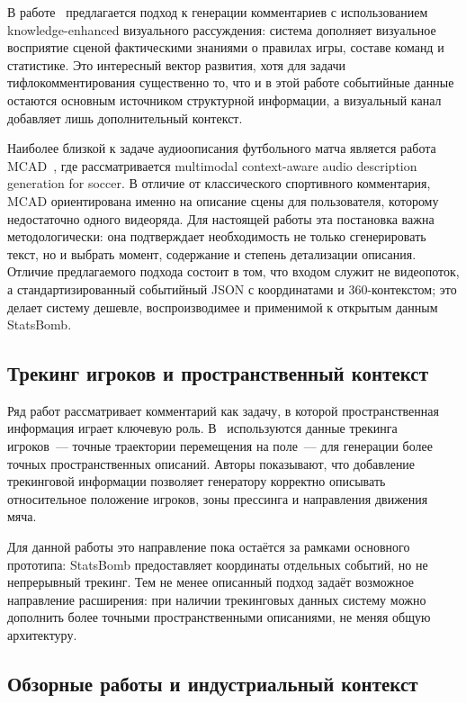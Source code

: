 \documentclass[a4paper,14pt]{extarticle}
\numberwithin{table}{section}
\numberwithin{figure}{section}
\numberwithin{equation}{section}
\begin{document}
В работе~\cite{vision2026} предлагается подход к генерации комментариев с использованием knowledge-enhanced визуального рассуждения: система дополняет визуальное восприятие сценой фактическими знаниями о правилах игры, составе команд и статистике. Это интересный вектор развития, хотя для задачи тифлокомментирования существенно то, что и в этой работе событийные данные остаются основным источником структурной информации, а визуальный канал добавляет лишь дополнительный контекст.

Наиболее близкой к задаче аудиоописания футбольного матча является работа MCAD~\cite{mcad2025}, где рассматривается multimodal context-aware audio description generation for soccer. В отличие от классического спортивного комментария, MCAD ориентирована именно на описание сцены для пользователя, которому недостаточно одного видеоряда. Для настоящей работы эта постановка важна методологически: она подтверждает необходимость не только сгенерировать текст, но и выбрать момент, содержание и степень детализации описания. Отличие предлагаемого подхода состоит в том, что входом служит не видеопоток, а стандартизированный событийный JSON с координатами и 360-контекстом; это делает систему дешевле, воспроизводимее и применимой к открытым данным StatsBomb.

\subsection{Трекинг игроков и пространственный контекст}

Ряд работ рассматривает комментарий как задачу, в которой пространственная информация играет ключевую роль. В~\cite{tracking2025} используются данные трекинга игроков~--- точные траектории перемещения на поле~--- для генерации более точных пространственных описаний. Авторы показывают, что добавление трекинговой информации позволяет генератору корректно описывать относительное положение игроков, зоны прессинга и направления движения мяча.

Для данной работы это направление пока остаётся за рамками основного прототипа: StatsBomb предоставляет координаты отдельных событий, но не непрерывный трекинг. Тем не менее описанный подход задаёт возможное направление расширения: при наличии трекинговых данных систему можно дополнить более точными пространственными описаниями, не меняя общую архитектуру.

\subsection{Обзорные работы и индустриальный контекст}
\end{document}
